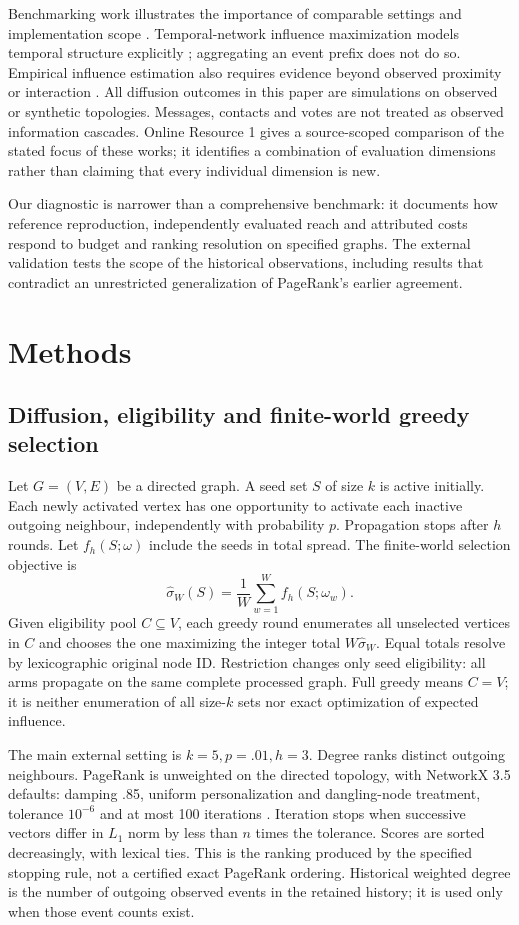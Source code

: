 \documentclass[smallextended]{svjour3}
\begin{document}
Benchmarking work illustrates the importance of comparable settings and implementation scope \cite{ref16}. Temporal-network influence maximization models temporal structure explicitly \cite{ref11}; aggregating an event prefix does not do so. Empirical influence estimation also requires evidence beyond observed proximity or interaction \cite{ref15}. All diffusion outcomes in this paper are simulations on observed or synthetic topologies. Messages, contacts and votes are not treated as observed information cascades. Online Resource 1 gives a source-scoped comparison of the stated focus of these works; it identifies a combination of evaluation dimensions rather than claiming that every individual dimension is new.

Our diagnostic is narrower than a comprehensive benchmark: it documents how reference reproduction, independently evaluated reach and attributed costs respond to budget and ranking resolution on specified graphs. The external validation tests the scope of the historical observations, including results that contradict an unrestricted generalization of PageRank's earlier agreement.

\section{Methods}
\subsection{Diffusion, eligibility and finite-world greedy selection}
Let $G=(V,E)$ be a directed graph. A seed set $S$ of size $k$ is active initially. Each newly activated vertex has one opportunity to activate each inactive outgoing neighbour, independently with probability $p$. Propagation stops after $h$ rounds. Let $f_h(S;\omega)$ include the seeds in total spread. The finite-world selection objective is
\begin{equation}
\widehat\sigma_W(S)=\frac{1}{W}\sum_{w=1}^{W}f_h(S;\omega_w).
\end{equation}
Given eligibility pool $C\subseteq V$, each greedy round enumerates all unselected vertices in $C$ and chooses the one maximizing the integer total $W\widehat\sigma_W$. Equal totals resolve by lexicographic original node ID. Restriction changes only seed eligibility: all arms propagate on the same complete processed graph. Full greedy means $C=V$; it is neither enumeration of all size-$k$ sets nor exact optimization of expected influence.

The main external setting is $k=5,p=.01,h=3$. Degree ranks distinct outgoing neighbours. PageRank is unweighted on the directed topology, with NetworkX 3.5 defaults: damping .85, uniform personalization and dangling-node treatment, tolerance $10^{-6}$ and at most 100 iterations \cite{networkxpr}. Iteration stops when successive vectors differ in $L_1$ norm by less than $n$ times the tolerance. Scores are sorted decreasingly, with lexical ties. This is the ranking produced by the specified stopping rule, not a certified exact PageRank ordering. Historical weighted degree is the number of outgoing observed events in the retained history; it is used only when those event counts exist.
\end{document}
